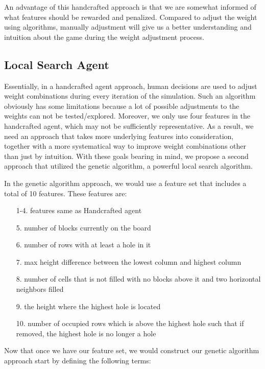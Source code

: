 \documentclass[letterpaper]{article} %
\begin{document}
An advantage of this handcrafted approach is that we are somewhat informed of what features should be rewarded and penalized. Compared to adjust the weight using algorithms, manually adjustment will give us a better understanding and intuition about the game during the weight adjustment process.
\subsection{Local Search Agent}
Essentially, in a handcrafted agent approach, human decisions are used to adjust weight combinations during every iteration of the simulation. Such an algorithm obviously has some limitations because a lot of possible adjustments to the weights can not be tested/explored. Moreover, we only use four features in the handcrafted agent, which may not be sufficiently representative. As a result, we need an approach that takes more underlying features into consideration, together with a more systematical way to improve weight combinations other than just by intuition. With these goals bearing in mind, we propose a second approach that utilized the genetic algorithm, a powerful local search algorithm.

In the genetic algorithm approach, we would use a feature set that includes a total of 10 features. These features are:
\begin{enumerate}
 \item[1-4.] features same as Handcrafted agent
 \item[5.] number of blocks currently on the board
 \item[6.] number of rows with at least a hole in it
 \item[7.] max height difference between the lowest column and highest column
 \item[8.] number of cells that is not filled with no blocks above it and two horizontal neighbors filled
 \item[9.] the height where the highest hole is located
 \item[10.] number of occupied rows which is above the highest hole such that if removed, the highest hole is no longer a hole
\end{enumerate}

Now that once we have our feature set, we would construct our genetic algorithm approach start by defining the following terms:
\end{document}
